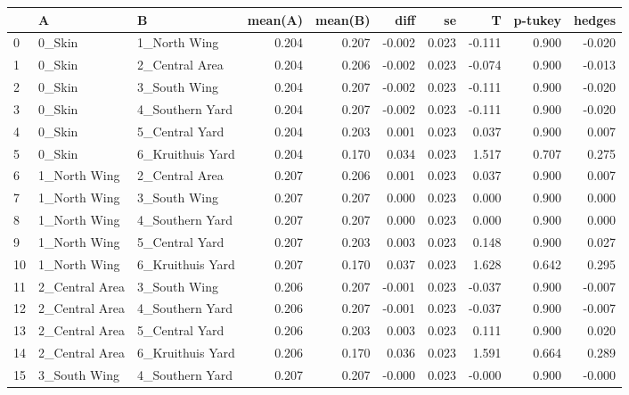 \begin{tabular}{lllrrrrrrr}
\toprule
{} &                A &                 B &  mean(A) &  mean(B) &   diff &     se &      T &  p-tukey &  hedges \\
\midrule
0  &           0\_Skin &      1\_North Wing &    0.204 &    0.207 & -0.002 &  0.023 & -0.111 &    0.900 &  -0.020 \\
1  &           0\_Skin &    2\_Central Area &    0.204 &    0.206 & -0.002 &  0.023 & -0.074 &    0.900 &  -0.013 \\
2  &           0\_Skin &      3\_South Wing &    0.204 &    0.207 & -0.002 &  0.023 & -0.111 &    0.900 &  -0.020 \\
3  &           0\_Skin &   4\_Southern Yard &    0.204 &    0.207 & -0.002 &  0.023 & -0.111 &    0.900 &  -0.020 \\
4  &           0\_Skin &    5\_Central Yard &    0.204 &    0.203 &  0.001 &  0.023 &  0.037 &    0.900 &   0.007 \\
5  &           0\_Skin &  6\_Kruithuis Yard &    0.204 &    0.170 &  0.034 &  0.023 &  1.517 &    0.707 &   0.275 \\
6  &     1\_North Wing &    2\_Central Area &    0.207 &    0.206 &  0.001 &  0.023 &  0.037 &    0.900 &   0.007 \\
7  &     1\_North Wing &      3\_South Wing &    0.207 &    0.207 &  0.000 &  0.023 &  0.000 &    0.900 &   0.000 \\
8  &     1\_North Wing &   4\_Southern Yard &    0.207 &    0.207 &  0.000 &  0.023 &  0.000 &    0.900 &   0.000 \\
9  &     1\_North Wing &    5\_Central Yard &    0.207 &    0.203 &  0.003 &  0.023 &  0.148 &    0.900 &   0.027 \\
10 &     1\_North Wing &  6\_Kruithuis Yard &    0.207 &    0.170 &  0.037 &  0.023 &  1.628 &    0.642 &   0.295 \\
11 &   2\_Central Area &      3\_South Wing &    0.206 &    0.207 & -0.001 &  0.023 & -0.037 &    0.900 &  -0.007 \\
12 &   2\_Central Area &   4\_Southern Yard &    0.206 &    0.207 & -0.001 &  0.023 & -0.037 &    0.900 &  -0.007 \\
13 &   2\_Central Area &    5\_Central Yard &    0.206 &    0.203 &  0.003 &  0.023 &  0.111 &    0.900 &   0.020 \\
14 &   2\_Central Area &  6\_Kruithuis Yard &    0.206 &    0.170 &  0.036 &  0.023 &  1.591 &    0.664 &   0.289 \\
15 &     3\_South Wing &   4\_Southern Yard &    0.207 &    0.207 & -0.000 &  0.023 & -0.000 &    0.900 &  -0.000 \\

\end{tabular}
